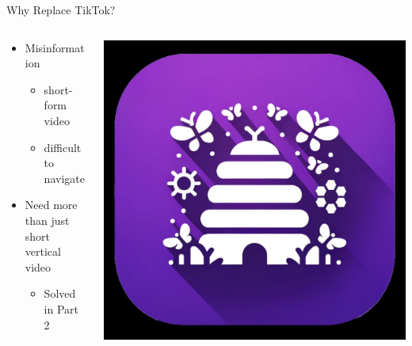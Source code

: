 \documentclass[aspectratio=169]{beamer}
\begin{document}
\begin{frame}{Why Replace TikTok?}
\begin{columns}[T]
    \begin{column}[T]{0.5\textwidth}
        \begin{itemize}
            \item Misinformation
            \begin{itemize}
                \item short-form video
                \item difficult to navigate
            \end{itemize}
            \item Need more than just short vertical video
            \begin{itemize}
                \item Solved in Part 2
            \end{itemize}
        \end{itemize}
    \end{column}
    \begin{column}{0.5\textwidth}
        \includegraphics[height=0.8\textheight]{imgs/app_icons/2.png}
    \end{column}
\end{columns}
\end{frame}
\end{document}
